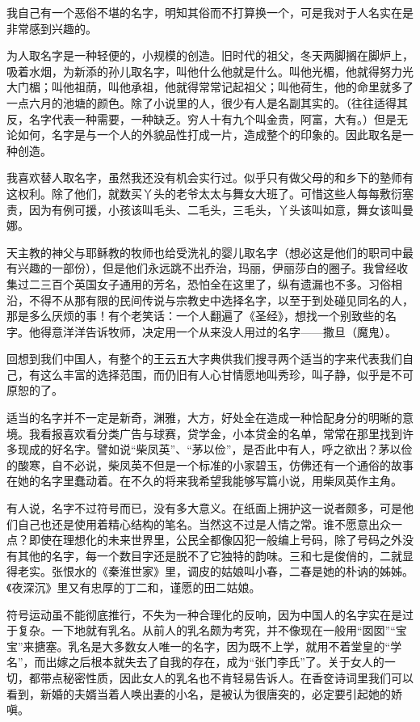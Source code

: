 \par 我自己有一个恶俗不堪的名字，明知其俗而不打算换一个，可是我对于人名实在是非常感到兴趣的。
\par 为人取名字是一种轻便的，小规模的创造。旧时代的祖父，冬天两脚搁在脚炉上，吸着水烟，为新添的孙儿取名字，叫他什么他就是什么。叫他光楣，他就得努力光大门楣；叫他祖荫，叫他承祖，他就得常常记起祖父；叫他荷生，他的命里就多了一点六月的池塘的颜色。除了小说里的人，很少有人是名副其实的。（往往适得其反，名字代表一种需要，一种缺乏。穷人十有九个叫金贵，阿富，大有。）但是无论如何，名字是与一个人的外貌品性打成一片，造成整个的印象的。因此取名是一种创造。
\par 我喜欢替人取名字，虽然我还没有机会实行过。似乎只有做父母的和乡下的塾师有这权利。除了他们，就数买丫头的老爷太太与舞女大班了。可惜这些人每每敷衍塞责，因为有例可援，小孩该叫毛头、二毛头，三毛头，丫头该叫如意，舞女该叫曼娜。
\par 天主教的神父与耶稣教的牧师也给受洗礼的婴儿取名字（想必这是他们的职司中最有兴趣的一部份），但是他们永远跳不出乔治，玛丽，伊丽莎白的圈子。我曾经收集过二三百个英国女子通用的芳名，恐怕全在这里了，纵有遗漏也不多。习俗相沿，不得不从那有限的民间传说与宗教史中选择名字，以至于到处碰见同名的人，那是多么厌烦的事！有个老笑话：一个人翻遍了《圣经》，想找一个别致些的名字。他得意洋洋告诉牧师，决定用一个从来没人用过的名字——撒旦（魔鬼）。
\par 回想到我们中国人，有整个的王云五大字典供我们搜寻两个适当的字来代表我们自己，有这么丰富的选择范围，而仍旧有人心甘情愿地叫秀珍，叫子静，似乎是不可原恕的了。
\par 适当的名字并不一定是新奇，渊雅，大方，好处全在造成一种恰配身分的明晰的意境。我看报喜欢看分类广告与球赛，贷学金，小本贷金的名单，常常在那里找到许多现成的好名字。譬如说“柴凤英”、“茅以俭”，是否此中有人，呼之欲出？茅以俭的酸寒，自不必说，柴凤英不但是一个标准的小家碧玉，仿佛还有一个通俗的故事在她的名字里蠢动着。在不久的将来我希望我能够写篇小说，用柴凤英作主角。
\par 有人说，名字不过符号而已，没有多大意义。在纸面上拥护这一说者颇多，可是他们自己也还是使用着精心结构的笔名。当然这不过是人情之常。谁不愿意出众一点？即使在理想化的未来世界里，公民全都像囚犯一般编上号码，除了号码之外没有其他的名字，每一个数目字还是脱不了它独特的韵味。三和七是俊俏的，二就显得老实。张恨水的《秦淮世家》里，调皮的姑娘叫小春，二春是她的朴讷的姊姊。《夜深沉》里又有忠厚的丁二和，谨愿的田二姑娘。
\par 符号运动虽不能彻底推行，不失为一种合理化的反响，因为中国人的名字实在是过于复杂。一下地就有乳名。从前人的乳名颇为考究，并不像现在一般用“囡囡”“宝宝”来搪塞。乳名是大多数女人唯一的名字，因为既不上学，就用不着堂皇的“学名”，而出嫁之后根本就失去了自我的存在，成为“张门李氏”了。关于女人的一切，都带点秘密性质，因此女人的乳名也不肯轻易告诉人。在香奁诗词里我们可以看到，新婚的夫婿当着人唤出妻的小名，是被认为很唐突的，必定要引起她的娇嗔。
